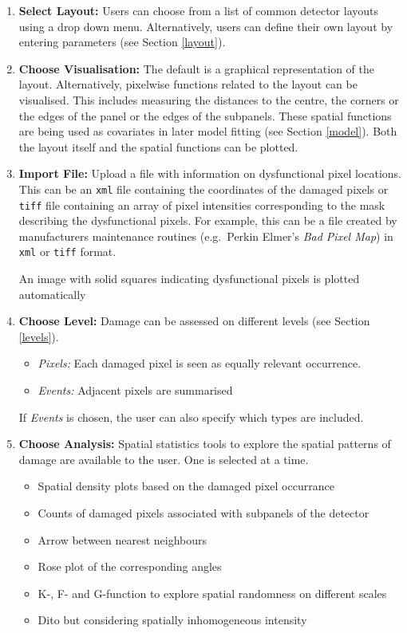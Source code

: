 \documentclass[11pt,a4paper,twosided]{article}
\begin{document}
\begin{mdframed}

\medskip

\begin{enumerate}

\item {\bf Select Layout:} 
Users can choose from a list of common detector layouts using a drop down menu. 
Alternatively, users can define their own layout by entering parameters (see Section \ref{layout}). 

\item {\bf Choose Visualisation:} 
The default is a graphical representation of the layout.
Alternatively, pixelwise functions related to the layout can be visualised. This includes 
measuring the distances to the centre, the corners or the edges of the panel or the edges 
of the subpanels. 
These spatial functions are being used as covariates in later model fitting (see Section \ref{model}).
Both the layout itself and the spatial functions can be plotted.

\item {\bf Import File:} 
Upload a file with information on dysfunctional pixel locations.
This can be an \texttt{xml} file containing the coordinates of the damaged pixels
or \texttt{tiff} file containing an array of pixel intensities corresponding to the mask 
describing the dysfunctional pixels. 
For example, this can be a file created by manufacturers maintenance routines 
(e.g.~Perkin Elmer's {\it Bad Pixel Map}) in \texttt{xml} or \texttt{tiff} format.

An image with solid squares indicating dysfunctional pixels
is plotted automatically 

\item {\bf Choose Level:} 
Damage can be assessed on different levels (see Section \ref{levels}).
\begin{itemize}
\item {\it Pixels:} Each damaged pixel is seen as equally relevant occurrence.
\item {\it Events:} Adjacent pixels are summarised 
\end{itemize}
If {\it Events} is chosen, the user can also specify which types are included.

\item {\bf Choose Analysis:} 
Spatial statistics tools to explore the spatial patterns of damage are available
to the user. One is selected at a time.
\begin{itemize}
\item Spatial density plots based on the damaged pixel occurrance
\item Counts of damaged pixels associated with subpanels of the detector
\item Arrow between nearest neighbours
\item Rose plot of the corresponding angles
\item K-, F- and G-function to explore spatial randomness on different scales
\item Dito but considering spatially inhomogeneous intensity
\end{itemize}


\end{enumerate}
\end{mdframed}
\end{document}
